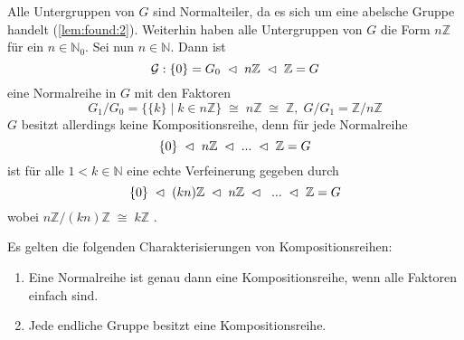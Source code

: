 \documentclass[../main.tex]{subfiles}
\begin{document}
\begin{example}[Kompositionsreihen von $(G := (\Z,+)$]
    Alle Untergruppen von $G$ sind Normalteiler, da es sich um eine abelsche Gruppe handelt (\cref{lem:found:2}). Weiterhin haben alle Untergruppen von $G$ die Form $n\mathbb{Z}$ für ein $n \in \mathbb{N}_0$.
    Sei nun $n \in \mathbb{N}$. Dann ist
    $$\mathcal{G}: \{0\} = G_0 \; \vartriangleleft \; n\mathbb{Z} \; \vartriangleleft \; \mathbb{Z} = G$$ eine Normalreihe in $G$ mit den Faktoren $$G_1/G_0 = \{\{k\} \mid k \in n\mathbb{Z}\} \; \cong \; n\mathbb{Z} \; \cong \; \mathbb{Z}, \; G/G_1 = \mathbb{Z}/n\mathbb{Z}$$
    $G$ besitzt allerdings keine Kompositionsreihe, denn für jede Normalreihe $$\{0\} \; \vartriangleleft \; n\mathbb{Z} \; \vartriangleleft \; ... \; \vartriangleleft \; \mathbb{Z} = G$$ ist für alle $1 < k \in \mathbb{N}$ eine echte Verfeinerung gegeben durch $$\{0\} \; \vartriangleleft \; (kn)\mathbb{Z} \; \vartriangleleft \; n\mathbb{Z} \; \vartriangleleft \; \; ... \; \vartriangleleft \; \mathbb{Z} = G$$
    wobei $n\mathbb{Z}/(kn)\mathbb{Z} \; \cong \; k\mathbb{Z}$ \TODO.
\end{example}
\begin{theorem} Es gelten die folgenden Charakterisierungen von Kompositionsreihen:
    \begin{enumerate}[label=(\alph*)]
        \item Eine Normalreihe ist genau dann eine Kompositionsreihe, wenn alle Faktoren einfach sind.
        \item Jede endliche Gruppe besitzt eine Kompositionsreihe.
    \end{enumerate}
\end{theorem}
\end{document}
